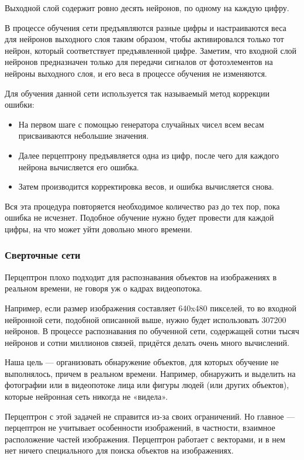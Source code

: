 Выходной слой содержит ровно десять нейронов, по одному на каждую цифру.

В процессе обучения сети предъявляются разные цифры и настраиваются веса для нейронов выходного слоя таким образом, чтобы активировался только тот нейрон, который соответствует предъявленной цифре. Заметим, что входной слой нейронов предназначен только для передачи сигналов от фотоэлементов на нейроны выходного слоя, и его веса в процессе обучения не изменяются.

Для обучения данной сети используется так называемый метод коррекции ошибки:
\begin{itemize}
    \item На первом шаге с помощью генератора случайных чисел всем весам присваиваются небольшие значения.
    \item Далее перцептрону предъявляется одна из цифр, после чего для каждого нейрона вычисляется его ошибка.
    \item Затем производится корректировка весов, и ошибка вычисляется снова.
\end{itemize}

Вся эта процедура повторяется необходимое количество раз до тех пор, пока ошибка не исчезнет. Подобное обучение нужно будет провести для каждой цифры, на что может уйти довольно много времени.

\subsubsection*{Сверточные сети}

Перцептрон плохо подходит для распознавания объектов на изображениях в реальном времени, не говоря уж о кадрах видеопотока.

Например, если размер изображения составляет 640x480 пикселей, то во входной нейронной сети, подобной описанной выше, нужно будет использовать 307200 нейронов. В процессе распознавания по обученной сети, содержащей сотни тысяч нейронов и сотни миллионов связей, придётся делать очень много вычислений.

Наша цель — организовать обнаружение объектов, для которых обучение не выполнялось, причем в реальном времени. Например, обнаружить и выделить на фотографии или в видеопотоке лица или фигуры людей (или других объектов), которые нейронная сеть никогда не «видела».

Перцептрон с этой задачей не справится из-за своих ограничений. Но главное — перцептрон не учитывает особенности изображений, в частности, взаимное расположение частей изображения. Перцептрон работает с векторами, и в нем нет ничего специального для поиска объектов на изображениях.\\

